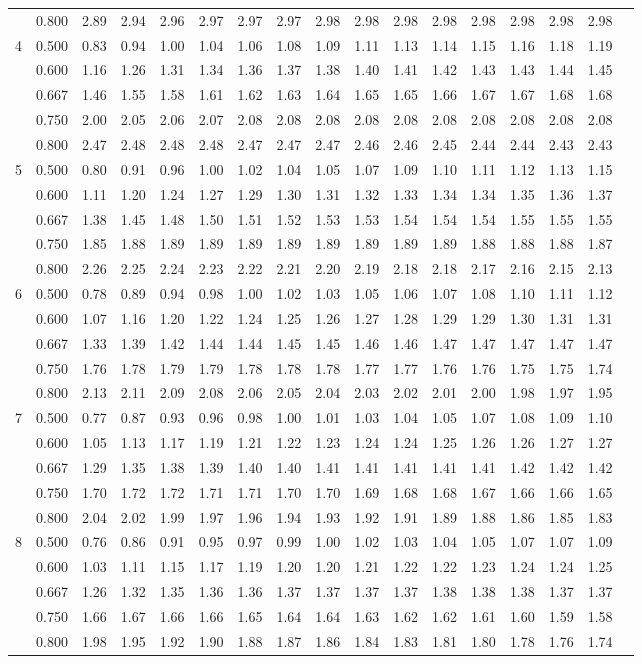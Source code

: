 {\begin{center}
\begin{tabular}{rrr@{\,}r@{\,}r@{\,}r@{\,}r@{\,}r@{\,}r@{\,}r
                   @{\,}r@{\,}r@{\,}r@{\,}r@{\,}r@{\,}r@{\,}r}
 &0.800&2.89&2.94&2.96&2.97&2.97&2.97&2.98&2.98&2.98&2.98&2.98&2.98&2.98&2.98\\
4&0.500&0.83&0.94&1.00&1.04&1.06&1.08&1.09&1.11&1.13&1.14&1.15&1.16&1.18&1.19\\
 &0.600&1.16&1.26&1.31&1.34&1.36&1.37&1.38&1.40&1.41&1.42&1.43&1.43&1.44&1.45\\
 &0.667&1.46&1.55&1.58&1.61&1.62&1.63&1.64&1.65&1.65&1.66&1.67&1.67&1.68&1.68\\
 &0.750&2.00&2.05&2.06&2.07&2.08&2.08&2.08&2.08&2.08&2.08&2.08&2.08&2.08&2.08\\
 &0.800&2.47&2.48&2.48&2.48&2.47&2.47&2.47&2.46&2.46&2.45&2.44&2.44&2.43&2.43\\
5&0.500&0.80&0.91&0.96&1.00&1.02&1.04&1.05&1.07&1.09&1.10&1.11&1.12&1.13&1.15\\
 &0.600&1.11&1.20&1.24&1.27&1.29&1.30&1.31&1.32&1.33&1.34&1.34&1.35&1.36&1.37\\
 &0.667&1.38&1.45&1.48&1.50&1.51&1.52&1.53&1.53&1.54&1.54&1.54&1.55&1.55&1.55\\
 &0.750&1.85&1.88&1.89&1.89&1.89&1.89&1.89&1.89&1.89&1.89&1.88&1.88&1.88&1.87\\
 &0.800&2.26&2.25&2.24&2.23&2.22&2.21&2.20&2.19&2.18&2.18&2.17&2.16&2.15&2.13\\
6&0.500&0.78&0.89&0.94&0.98&1.00&1.02&1.03&1.05&1.06&1.07&1.08&1.10&1.11&1.12\\
 &0.600&1.07&1.16&1.20&1.22&1.24&1.25&1.26&1.27&1.28&1.29&1.29&1.30&1.31&1.31\\
 &0.667&1.33&1.39&1.42&1.44&1.44&1.45&1.45&1.46&1.46&1.47&1.47&1.47&1.47&1.47\\
 &0.750&1.76&1.78&1.79&1.79&1.78&1.78&1.78&1.77&1.77&1.76&1.76&1.75&1.75&1.74\\
 &0.800&2.13&2.11&2.09&2.08&2.06&2.05&2.04&2.03&2.02&2.01&2.00&1.98&1.97&1.95\\
7&0.500&0.77&0.87&0.93&0.96&0.98&1.00&1.01&1.03&1.04&1.05&1.07&1.08&1.09&1.10\\
 &0.600&1.05&1.13&1.17&1.19&1.21&1.22&1.23&1.24&1.24&1.25&1.26&1.26&1.27&1.27\\
 &0.667&1.29&1.35&1.38&1.39&1.40&1.40&1.41&1.41&1.41&1.41&1.41&1.42&1.42&1.42\\
 &0.750&1.70&1.72&1.72&1.71&1.71&1.70&1.70&1.69&1.68&1.68&1.67&1.66&1.66&1.65\\
 &0.800&2.04&2.02&1.99&1.97&1.96&1.94&1.93&1.92&1.91&1.89&1.88&1.86&1.85&1.83\\
8&0.500&0.76&0.86&0.91&0.95&0.97&0.99&1.00&1.02&1.03&1.04&1.05&1.07&1.07&1.09\\
 &0.600&1.03&1.11&1.15&1.17&1.19&1.20&1.20&1.21&1.22&1.22&1.23&1.24&1.24&1.25\\
 &0.667&1.26&1.32&1.35&1.36&1.36&1.37&1.37&1.37&1.37&1.38&1.38&1.38&1.37&1.37\\
 &0.750&1.66&1.67&1.66&1.66&1.65&1.64&1.64&1.63&1.62&1.62&1.61&1.60&1.59&1.58\\
 &0.800&1.98&1.95&1.92&1.90&1.88&1.87&1.86&1.84&1.83&1.81&1.80&1.78&1.76&1.74
\end{tabular}
\end{center}

}
